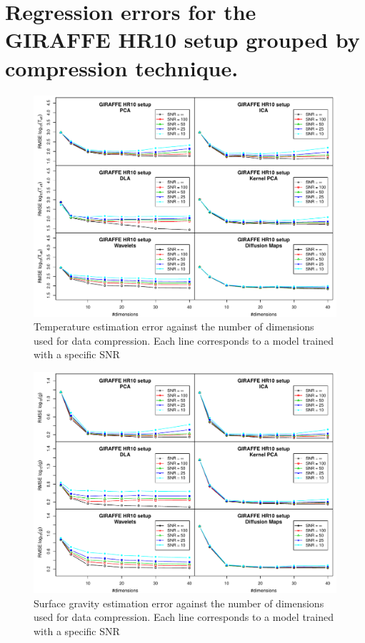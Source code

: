 \documentclass[a4paper,fleqn,usenatbib]{mnras}
\begin{document}
{{{\section{Regression errors for the GIRAFFE HR10 setup grouped by compression technique.}
\label{a1}
\begin{figure}
\centering\includegraphics[width=\textwidth]{flamesHR10_Teff_log_BestSVM_N-SNR-RMSE_test.pdf}
\caption{Temperature estimation error against the number of dimensions
  used for data compression. Each line corresponds to a model trained
  with a specific SNR}
\label{fig:methodsnrTeff}
\end{figure}

\begin{figure}
\centering\includegraphics[width=\textwidth]{flamesHR10_Logg_log_BestSVM_N-SNR-RMSE_test.pdf}
\caption{Surface gravity estimation error against the number of dimensions
  used for data compression. Each line corresponds to a model trained
  with a specific SNR}
\label{fig:methodsnrLogg}
\end{figure}

}}}
\end{document}
